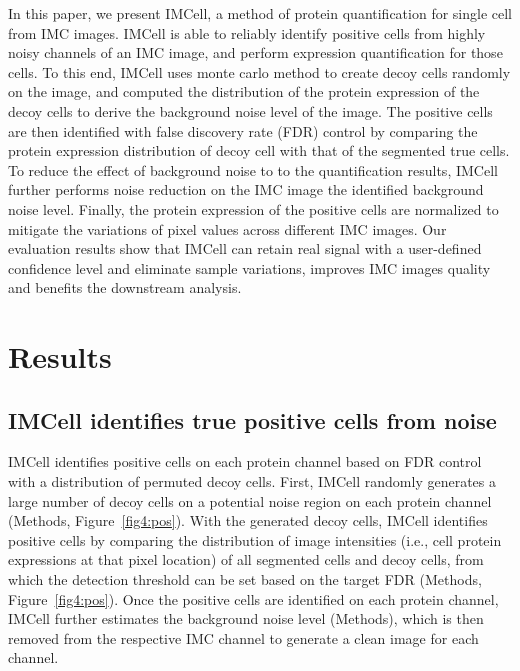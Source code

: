 \documentclass{mynature}
\begin{document}
In this paper, we present IMCell, a method of protein quantification for single cell from IMC images. 
IMCell is able to reliably identify positive cells from highly noisy channels of an IMC image, and perform expression quantification for those cells. To this end, IMCell uses monte carlo method to create decoy cells randomly on the image, and computed the distribution of the protein expression of the decoy cells to derive the background noise level of the image.
The positive cells are then identified with false discovery rate (FDR) control by comparing the protein expression distribution of decoy cell with that of the segmented true cells. To reduce the effect of background noise to to the quantification results, IMCell further performs noise reduction on the IMC image the identified background noise level. Finally, the protein expression of the positive cells are normalized to mitigate the variations of pixel values across different IMC images. 
%
%
Our evaluation results show that IMCell can retain real signal with a user-defined confidence level and eliminate sample variations, improves IMC images quality and benefits the downstream analysis.  

\section{Results}


\subsection{IMCell identifies true positive cells from noise}


%
IMCell identifies positive cells on each protein channel based on FDR control with a distribution of permuted decoy cells. 
First, IMCell randomly generates a large number of decoy cells on a potential noise region on each protein channel (Methods, Figure~\ref{fig4:pos}). 
With the generated decoy cells, IMCell identifies positive cells by comparing the distribution of image intensities (i.e., cell protein expressions at that pixel location) of all segmented cells and decoy cells, from which the detection threshold can be set based on the target FDR (Methods, Figure~\ref{fig4:pos}). 
Once the positive cells are identified on each protein channel, IMCell further estimates the background noise level (Methods), which is then removed from the respective IMC channel to generate a clean image for each channel. 
\end{document}
